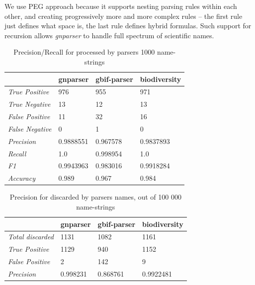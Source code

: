 \documentclass{bmcart}
\begin{document}
\vspace{0.5cm}

We use PEG approach because it supports nesting parsing rules within each
other, and creating progressively more and more complex rules -- the first rule
just defines what space is, the last rule defines hybrid formulas.  Such
support for recursion allows \textit{gnparser} to handle full spectrum of
scientific names.

\begin{table}[htb]
  \begin{center}
    \caption{Precision/Recall for processed by parsers 1000
    name-strings}\label{table:precision}
    \resizebox{10cm}{!} {
    \begin{tabular}{|l|*{3}{l}|}
      \hline
                             & gnparser & gbif-parser & biodiversity \\
      \hline
      \textit{True Positive} & 976      & 955         & 971          \\
      \textit{True Negative} & 13       & 12          & 13           \\
      \textit{False Positive}& 11       & 32          & 16           \\
      \textit{False Negative}& 0        & 1           & 0            \\
      \textit{Precision}     & 0.9888551& 0.967578    & 0.9837893    \\
      \textit{Recall}        & 1.0      & 0.998954    & 1.0          \\
      \textit{F1}            & 0.9943963& 0.983016    & 0.9918284    \\
      \textit{Accuracy}      & 0.989    & 0.967       & 0.984        \\
      \hline
    \end{tabular}
    }
  \end{center}
\end{table}

\begin{table}[htb]
  \begin{center}
    \caption{Precision for discarded by parsers names, out of 100 000
    name-strings}\label{table:unparsed}
    \resizebox{10cm}{!} {
    \begin{tabular}{| l | *{3}{l} |}
      \hline
                              & gnparser & gbif-parser & biodiversity \\
      \hline
      \textit{Total discarded}& 1131     & 1082        & 1161         \\
      \textit{True Positive}  & 1129     & 940         & 1152         \\
      \textit{False Positive} & 2        & 142         & 9            \\
      \textit{Precision}      & 0.998231 & 0.868761    & 0.9922481    \\
      \hline
    \end{tabular}
  }
  \end{center}
\end{table}
\end{document}
